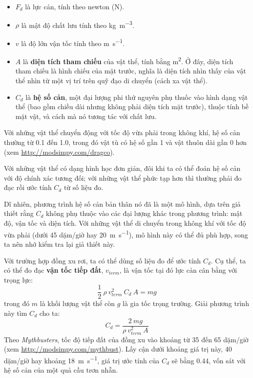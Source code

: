 \documentclass[12pt, openany]{book}
\theoremstyle{exercise}
\begin{document}
\begin{itemize}

\item $F_d$ là lực cản, tính theo newton (\si{\newton}).

\item $\rho$ là mật độ chất lưu tính theo \si{\kg\per\meter\cubed}.

\item $v$ là độ lớn vận tốc tính theo \si{\meter\per\second}.

\item $A$ là {\bf diện tích tham chiếu} của vật thể, tính bằng \si{\meter\squared}.  Ở đây, diện tích tham chiếu là hình chiếu của mặt trước, nghĩa là diện tích nhìn thấy của vật thể nhìn từ một vị trí trên quỹ đạo di chuyển (cách xa vật thể).


\item $C_d$ là {\bf hệ số cản}, một đại lượng phi thứ nguyên phụ thuốc vào hình dạng vật thể (bao gồm chiều dài nhưng không phải diện tích mặt trước), thuộc tính bề mặt vật, và cách mà nó tương tác với chất lưu.


\end{itemize}

Với những vật thể chuyển động với tốc độ vừa phải trong không khí, hệ số cản thường từ 0.1 đến 1.0, trong đó vật tù có hệ số gần 1 và vật thuôn dài gần 0 hơn (xem \url{http://modsimpy.com/dragco}).

Với những vật thể có dạng hình học đơn giản, đôi khi ta có thể đoán hệ số cản với độ chính xác tương đối; với những vật thể phức tạp hơn thì thường phải đo đạc rồi ước tính $C_d$ từ số liệu đo.

Dĩ nhiên, phương trình hệ số cản bản thân nó đã là một mô hình, dựa trên giả thiết rằng $C_d$ không phụ thuộc vào các đại lượng khác trong phương trình: mật độ, vận tốc và diện tích. Với những vật thể di chuyển trong không khí với tốc độ vừa phải (dưới 45 dặm/giờ hay \SI{20}{\meter\per\second}), mô hình này có thể đủ phù hợp, song ta nên nhớ kiểm tra lại giả thiết này.

Với trường hợp đồng xu rơi, ta có thể dùng số liệu đo để ước tính $C_d$.   Cụ thể, ta có thể đo đạc {\bf vận tốc tiếp đất}, $v_{term}$, là vận tốc tại đó lực cản cân bằng với trọng lực:
%
\[ \frac{1}{2}~\rho~v_{term}^2~C_d~A = m g \]
%
trong đó $m$ là khối lượng vật thể còn $g$ là gia tốc trọng trường. Giải phương trình này tìm $C_d$ cho ta:
%
\[ C_d = \frac{2~m g}{\rho~v_{term}^2~A} \]
%
Theo {\it Mythbusters}, tốc độ tiếp đất của đồng xu vào khoảng từ 35 đến 65 dặm/giờ (xem \url{http://modsimpy.com/mythbust}).  Lấy cận dưới khoảng giá trị này, 40 dặm/giờ hay khoảng \SI{18}{\meter\per\second}, giá trị ước tính của $C_d$ sẽ bằng 0.44, vốn sát với hệ số cản của một quả cầu trơn nhẵn.
\end{document}
